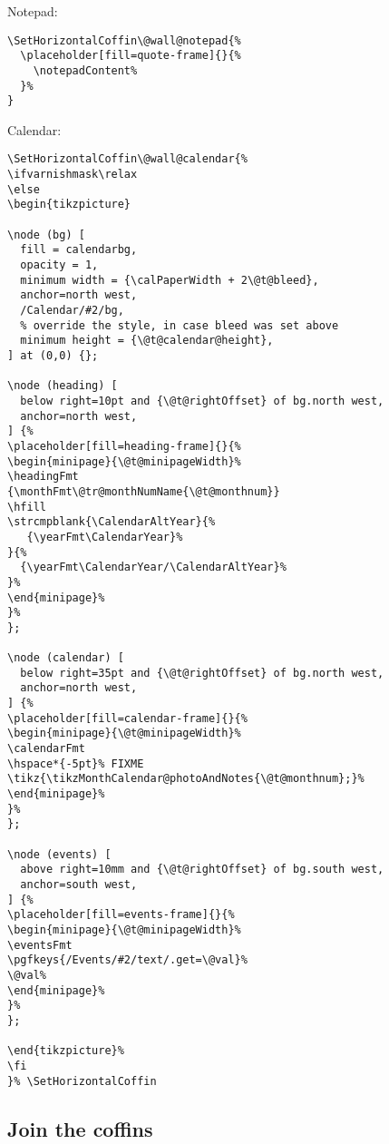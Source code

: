 \documentclass[11pt,oneside]{memoir-article}
\begin{document}
Notepad:

\begin{verbatim}
\SetHorizontalCoffin\@wall@notepad{%
  \placeholder[fill=quote-frame]{}{%
    \notepadContent%
  }%
}
\end{verbatim}

Calendar:

\begin{verbatim}
\SetHorizontalCoffin\@wall@calendar{%
\ifvarnishmask\relax
\else
\begin{tikzpicture}

\node (bg) [
  fill = calendarbg,
  opacity = 1,
  minimum width = {\calPaperWidth + 2\@t@bleed},
  anchor=north west,
  /Calendar/#2/bg,
  % override the style, in case bleed was set above
  minimum height = {\@t@calendar@height},
] at (0,0) {};

\node (heading) [
  below right=10pt and {\@t@rightOffset} of bg.north west,
  anchor=north west,
] {%
\placeholder[fill=heading-frame]{}{%
\begin{minipage}{\@t@minipageWidth}%
\headingFmt
{\monthFmt\@tr@monthNumName{\@t@monthnum}}
\hfill
\strcmpblank{\CalendarAltYear}{%
   {\yearFmt\CalendarYear}%
}{%
  {\yearFmt\CalendarYear/\CalendarAltYear}%
}%
\end{minipage}%
}%
};

\node (calendar) [
  below right=35pt and {\@t@rightOffset} of bg.north west,
  anchor=north west,
] {%
\placeholder[fill=calendar-frame]{}{%
\begin{minipage}{\@t@minipageWidth}%
\calendarFmt
\hspace*{-5pt}% FIXME
\tikz{\tikzMonthCalendar@photoAndNotes{\@t@monthnum};}%
\end{minipage}%
}%
};

\node (events) [
  above right=10mm and {\@t@rightOffset} of bg.south west,
  anchor=south west,
] {%
\placeholder[fill=events-frame]{}{%
\begin{minipage}{\@t@minipageWidth}%
\eventsFmt
\pgfkeys{/Events/#2/text/.get=\@val}%
\@val%
\end{minipage}%
}%
};

\end{tikzpicture}%
\fi
}% \SetHorizontalCoffin
\end{verbatim}

\subsection{Join the coffins}
\label{sec:orgd4e58d5}
\end{document}

